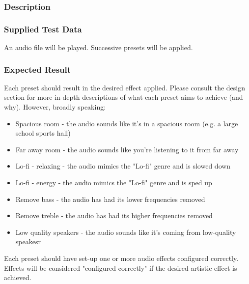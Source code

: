 \subsubsection*{Description}
\paragraph{}
{
	\centering
}

\subsubsection*{Supplied Test Data}
An audio file will be played. Successive presets will be applied.

\subsubsection*{Expected Result}
Each preset should result in the desired effect applied. Please consult the design section for more in-depth descriptions of what each preset aims to achieve (and why). However, broadly speaking:
\begin{itemize}
	\item Spacious room - the audio sounds like it's in a spacious room (e.g. a large school sports hall)
	\item Far away room - the audio sounds like you're listening to it from far away
	\item Lo-fi - relaxing - the audio mimics the "Lo-fi" genre and is slowed down
	\item Lo-fi - energy - the audio mimics the "Lo-fi" genre and is sped up
	\item Remove bass - the audio has had its lower frequencies removed
	\item Remove treble - the audio has had its higher frequencies removed
	\item Low quality speakers - the audio sounds like it's coming from low-quality speakesr
\end{itemize}
Each preset should have set-up one or more audio effects configured correctly. Effects will be considered "configured correctly" if the desired artistic effect is achieved.

